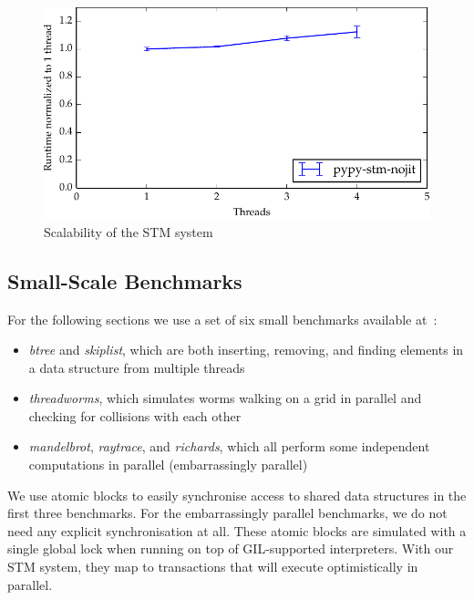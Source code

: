 \documentclass{sigplanconf}
\begin{document}
\begin{figure}[h]
  \centering
  \includegraphics[width=1\columnwidth]{plots/scaling.pdf}
  \caption{Scalability of the STM system\label{fig:scaling}}
\end{figure}


\subsection{Small-Scale Benchmarks\label{sec:performance-bench}}

For the following sections we use a set of six small benchmarks
available at~\cite{pypybenchs}:

\begin{itemize}
\item \emph{btree} and \emph{skiplist}, which are both inserting,
  removing, and finding elements in a data structure from multiple
  threads
\item \emph{threadworms}, which simulates worms walking on a grid in
  parallel and checking for collisions with each other
\item \emph{mandelbrot}, \emph{raytrace}, and \emph{richards}, which
  all perform some independent computations in parallel (embarrassingly
  parallel)
\end{itemize}

We use atomic blocks to easily synchronise access to shared
data structures in the first three benchmarks. For the embarrassingly
parallel benchmarks, we do not need any explicit synchronisation at
all. These atomic blocks are simulated with a single global lock
when running on top of GIL-supported interpreters. With our STM
system, they map to transactions that will execute optimistically
in parallel.


\end{document}

